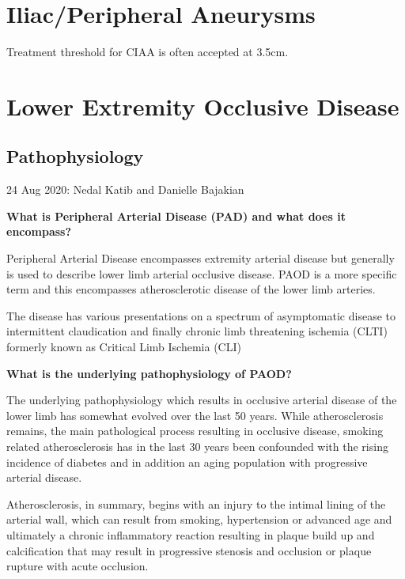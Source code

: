 \documentclass[
]{book}
\begin{document}
\hypertarget{iliacperipheral-aneurysms}{%
\chapter{Iliac/Peripheral Aneurysms}\label{iliacperipheral-aneurysms}}

Treatment threshold for CIAA is often accepted at 3.5cm.

\hypertarget{lower-extremity-occlusive-disease}{%
\chapter{Lower Extremity Occlusive Disease}\label{lower-extremity-occlusive-disease}}

\hypertarget{pathophysiology}{%
\section{Pathophysiology}\label{pathophysiology}}

24 Aug 2020: Nedal Katib and Danielle Bajakian

\textbf{What is Peripheral Arterial Disease (PAD) and what does it
encompass?}

Peripheral Arterial Disease encompasses extremity arterial disease but
generally is used to describe lower limb arterial occlusive disease.
PAOD is a more specific term and this encompasses atherosclerotic
disease of the lower limb arteries.

The disease has various presentations on a spectrum of asymptomatic
disease to intermittent claudication and finally chronic limb
threatening ischemia (CLTI) formerly known as Critical Limb Ischemia
(CLI) \citep{aboyans2017ESCGuidelines2018}

\textbf{What is the underlying pathophysiology of PAOD?}

The underlying pathophysiology which results in occlusive arterial
disease of the lower limb has somewhat evolved over the last 50 years.
While atherosclerosis remains, the main pathological process resulting
in occlusive disease, smoking related atherosclerosis has in the last 30
years been confounded with the rising incidence of diabetes and in
addition an aging population with progressive arterial disease.

Atherosclerosis, in summary, begins with an injury to the intimal lining
of the arterial wall, which can result from smoking, hypertension or
advanced age and ultimately a chronic inflammatory reaction resulting in
plaque build up and calcification that may result in progressive
stenosis and occlusion or plaque rupture with acute occlusion.
\end{document}
